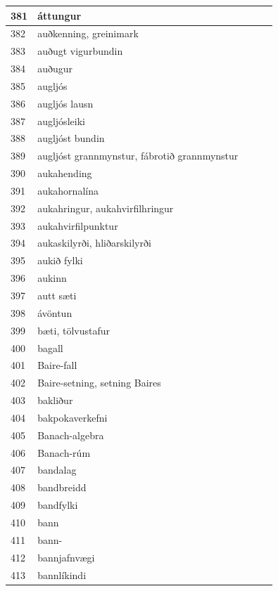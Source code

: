 \begin{longtable}{p{}|p{}|p{}|p{}|p{}}
\hline
381 & áttungur &  &  &  \\
\hline
382 & auðkenning, greinimark &  &  &  \\
\hline
383 & auðugt vigurbundin &  &  &  \\
\hline
384 & auðugur &  &  &  \\
\hline
385 & augljós &  &  &  \\
\hline
386 & augljós lausn &  &  &  \\
\hline
387 & augljósleiki &  &  &  \\
\hline
388 & augljóst bundin &  &  &  \\
\hline
389 & augljóst grannmynstur, fábrotið grannmynstur &  &  &  \\
\hline
390 & aukahending &  &  &  \\
\hline
391 & aukahornalína &  &  &  \\
\hline
392 & aukahringur, aukahvirfilhringur &  &  &  \\
\hline
393 & aukahvirfilpunktur &  &  &  \\
\hline
394 & aukaskilyrði, hliðarskilyrði &  &  &  \\
\hline
395 & aukið fylki &  &  &  \\
\hline
396 & aukinn &  &  &  \\
\hline
397 & autt sæti &  &  &  \\
\hline
398 & ávöntun &  &  &  \\
\hline
399 & bæti, tölvustafur &  &  &  \\
\hline
400 & bagall &  &  &  \\
\hline
401 & Baire-fall &  &  &  \\
\hline
402 & Baire-setning, setning Baires &  &  &  \\
\hline
403 & bakliður &  &  &  \\
\hline
404 & bakpokaverkefni &  &  &  \\
\hline
405 & Banach-algebra &  &  &  \\
\hline
406 & Banach-rúm &  &  &  \\
\hline
407 & bandalag &  &  &  \\
\hline
408 & bandbreidd &  &  &  \\
\hline
409 & bandfylki &  &  &  \\
\hline
410 & bann &  &  &  \\
\hline
411 & bann- &  &  &  \\
\hline
412 & bannjafnvægi &  &  &  \\
\hline
413 & bannlíkindi &  &  &  \\

\end{longtable}
